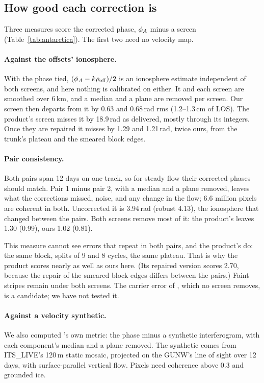 \subsection{How good each correction is}
Three measures score the corrected phase, $\phi_A$ minus a screen (Table~\ref{tab:antarctica}). The first two need no
velocity map.

\paragraph{Against the offsets' ionosphere.} With the phase tied, $(\phi_A - k\rho_\mathrm{off})/2$ is an ionosphere
estimate independent of both screens, and here nothing is calibrated on either. It and each screen are smoothed over
6\,km, and a median and a plane are removed per screen. Our screen then departs from it by 0.63 and 0.68\,rad rms
(1.2--1.3\,cm of LOS). The product's screen misses it by 18.9\,rad as delivered, mostly through its integers. Once they
are repaired it misses by 1.29 and 1.21\,rad, twice ours, from the trunk's plateau and the smeared block edges.

\paragraph{Pair consistency.} Both pairs span 12 days on one track, so for steady flow their corrected phases should
match. Pair 1 minus pair 2, with a median and a plane removed, leaves what the corrections missed, noise, and any change
in the flow; 6.6 million pixels are coherent in both. Uncorrected it is 3.94\,rad (robust 4.13), the ionosphere that
changed between the pairs. Both screens remove most of it: the product's leaves 1.30 (0.99), ours 1.02 (0.81).

This measure cannot see errors that repeat in both pairs, and the product's do: the same block, splits of 9 and 8
cycles, the same plateau. That is why the product scores nearly as well as ours here. (Its repaired version scores 2.70,
because the repair of the smeared block edges differs between the pairs.) Faint stripes remain under both screens. The
carrier error of \citet{joughin2026nisarerrors}, which no screen removes, is a candidate; we have not tested it.

\paragraph{Against a velocity synthetic.} We also computed \citet{joughin2026nisarerrors}'s own metric: the phase minus a synthetic interferogram, with each
component's median and a plane removed. The synthetic comes from ITS\_LIVE's 120\,m static mosaic, projected on the
GUNW's line of sight over 12 days, with surface-parallel vertical flow. Pixels need coherence above 0.3 and grounded ice.

